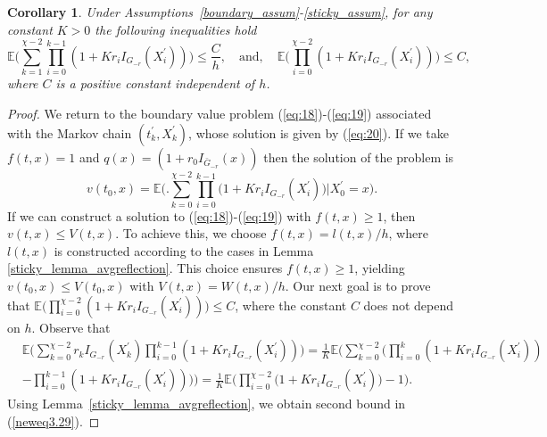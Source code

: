 \documentclass{article}
\newtheorem{corollary}{Corollary}[section]
\theoremstyle{definition}
\numberwithin{equation}{section}
\begin{document}
\begin{corollary} \label{sticky_lemma_avgreflection_corollary1}
Under Assumptions~\ref{boundary_assum}-\ref{sticky_assum}, for any constant $K>0$ the following inequalities hold
\begin{equation}\label{neweq3.29}
\mathbb{E}\bigg(\sum\limits_{k=1}^{\chi-2}\prod_{i=0}^{k-1}(1+Kr_{i}I_{G_{-r}}(X_{i}^{'}))\bigg) \leq \frac{C}{h},\quad\text{and},\quad
    \mathbb{E}\bigg( \prod_{i=0}^{\chi-2}(1+Kr_{i}I_{G_{-r}}(X_{i}^{'}))  \bigg) \leq C,
\end{equation}
where $C$ is a positive constant independent of $h$.
\end{corollary}
\begin{proof}
We return to the boundary value problem (\ref{eq:18})-(\ref{eq:19}) associated with the Markov chain $(t_{k}^{'},X_{k}^{'})$, whose solution is given by (\ref{eq:20}). If we take $f(t,x) = 1$ and $q(x) = (1+r_{0}{I_{\bar{G}_{-r}}(x)})$ then the solution
 of the problem is
\begin{equation}\label{3.27}
     v(t_0,x) = \mathbb{E}\Bigg( \bigg . \sum\limits_{k=0}^{\chi-2}\prod_{i=0}^{k-1}\big(1+Kr_{i}I_{G_{-r}}(X_{i}^{'})\big) \bigg |  X_{0}^{'}=x \Bigg).
\end{equation}
If we can construct a solution to (\ref{eq:18})-(\ref{eq:19}) with $f(t,x) \geq 1$, then $v(t,x) \leq V(t,x)$. To achieve this, we choose $f(t,x) = l(t,x)/h$, where $l(t,x)$ is constructed according to the cases in Lemma \ref{sticky_lemma_avgreflection}. This choice ensures $f(t,x) \geq 1$, yielding $v(t_0,x) \leq V(t_0,x)$ with $V(t,x) = W(t,x)/h$. Our next goal is to prove that $\mathbb{E}\big(\prod_{i=0}^{\chi-2}(1+Kr_{i}I_{G_{-r}}(X_{i}^{'}))\big) \leq C$, where the constant $C$ does not depend on $h$. Observe that
\begin{align*}
    &\mathbb{E}\bigg(\sum\limits_{k=0}^{\chi-2}r_{k}I_{G_{-r}}(X_{k}^{'})\prod_{i=0}^{k-1}(1+ Kr_{i}I_{G_{-r}}(X_{i}^{'}))\bigg)
     = \frac{1}{K}\mathbb{E}\bigg(\sum\limits_{k=0}^{\chi-2}\Big( \prod\limits_{i=0}^{k}(1+Kr_{i}I_{G_{-r}}(X_{i}^{'})) \\ & - \prod\limits_{i=0}^{k-1}(1+Kr_{i}I_{G_{-r}}(X_{i}^{'}))\Big)\bigg)
     =\frac{1}{K}\mathbb{E}\bigg(\prod\limits_{i=0}^{\chi-2}\big(1+Kr_{i}I_{G_{-r}}(X_{i}^{'})\big) - 1\bigg).
\end{align*}
Using Lemma~\ref{sticky_lemma_avgreflection}, we obtain second bound in (\ref{neweq3.29}). 
\end{proof}
\end{document}
